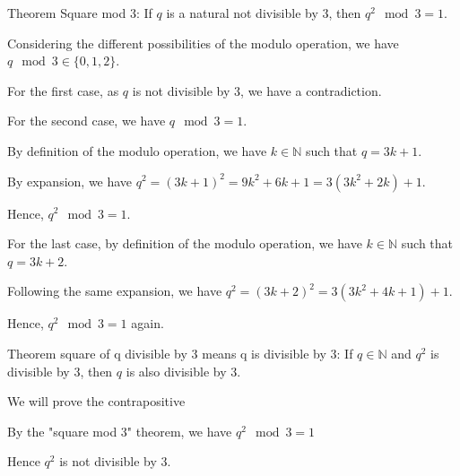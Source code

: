 Theorem Square mod 3: If $q$ is a natural not divisible by $3$, then $q^2 \mod 3 = 1$.

Considering the different possibilities of the modulo operation, we have $q \mod 3 \in \{ 0, 1, 2 \}$.

For the first case, as $q$ is not divisible by $3$, we have a contradiction.

For the second case, we have $q \mod 3 = 1$.

By definition of the modulo operation, we have $k \in \mathbb{N}$ such that $q = 3k + 1$.

By expansion, we have $q^2 = (3k+1)^2 = 9k^2+6k+1 = 3(3k^2 + 2k) + 1$.

Hence, $q^2 \mod 3 = 1$.

For the last case, by definition of the modulo operation, we have $k \in \mathbb{N}$ such that $q = 3k + 2$.

Following the same expansion, we have $q^2 = (3k+2)^2 = 3(3k^2+4k+1) +1$.

Hence, $q^2 \mod 3 = 1$ again.

Theorem square of q divisible by 3 means q is divisible by 3: If $q \in \mathbb{N}$ and $q^2$ is divisible by $3$, then $q$ is also divisible by $3$.

We will prove the contrapositive

By the "square mod 3" theorem, we have $q^2 \mod 3 = 1$

Hence $q^2$ is not divisible by $3$.